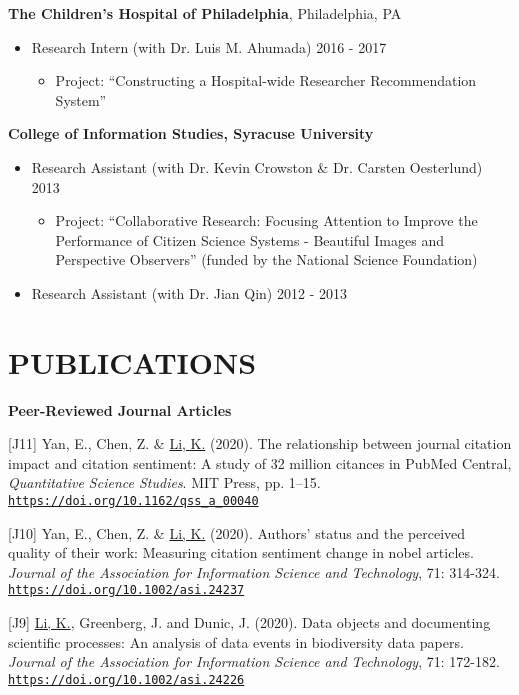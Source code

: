 \documentclass[margin, 10pt]{res} %
\begin{document}
\begin{resume}
\textbf{The Children's Hospital of Philadelphia}, Philadelphia, PA\\
\begin{itemize}
     \item Research Intern (with Dr. Luis M. Ahumada) \hfill 2016 - 2017
     \begin{itemize}
     	\item  Project: “Constructing a Hospital-wide Researcher Recommendation System”
   	\end{itemize}
\end{itemize}

\textbf{College of Information Studies, Syracuse University}\\
\begin{itemize}
	\item Research Assistant (with Dr. Kevin Crowston \& Dr. Carsten Oesterlund) \hfill 2013
    \begin{itemize}
     	\item Project: “Collaborative Research: Focusing Attention to Improve the Performance of Citizen Science Systems - Beautiful Images and Perspective Observers” (funded by the National Science Foundation)
    \end{itemize}
    \item Research Assistant (with Dr. Jian Qin) \hfill 2012 - 2013
\end{itemize}

\section{PUBLICATIONS}

\textbf{Peer-Reviewed Journal Articles}

[J11] Yan, E., Chen, Z. \& \underline{Li, K.} (2020). The relationship between journal citation impact and citation sentiment: A study of 32 million citances in PubMed Central, \textit{Quantitative Science Studies}. MIT Press, pp. 1–15. \href{https://doi.org/10.1162/qss_a_00040}{\nolinkurl{https://doi.org/10.1162/qss\_a\_00040}}

[J10] Yan, E., Chen, Z. \& \underline{Li, K.} (2020). Authors' status and the perceived quality of their work: Measuring citation sentiment change in nobel articles. \textit{Journal of the Association for Information Science and Technology}, 71: 314-324. \href{https://doi.org/10.1002/asi.24237}{\nolinkurl{https://doi.org/10.1002/asi.24237}}

[J9] \underline{Li, K.}, Greenberg, J. and Dunic, J. (2020). Data objects and documenting scientific processes: An analysis of data events in biodiversity data papers. \textit{Journal of the Association for Information Science and Technology}, 71: 172-182. \href{https://doi.org/10.1002/asi.24226}{\nolinkurl{https://doi.org/10.1002/asi.24226}}


\end{resume}
\end{document}

